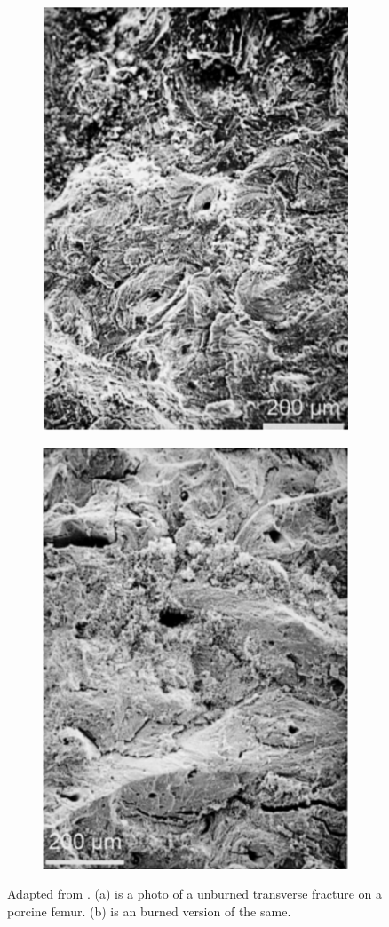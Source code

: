 \documentclass[titlepage]{article}
\begin{document}
\begin{figure}[h!]
\centering
\begin{subfigure}{.5\textwidth}
  \centering
  \includegraphics[width=.7\linewidth]{unburned_transverse}
  \end{subfigure}%
\begin{subfigure}{.5\textwidth}
  \centering
  \includegraphics[width=.7\linewidth]{burned_transverse}
\end{subfigure}
\caption{Adapted from \cite{fire-bone}. (a) is a photo of a unburned transverse fracture on a porcine femur. (b) is an burned version of the same.}
\label{fig:burn_fracture}
\end{figure}
\end{document}
